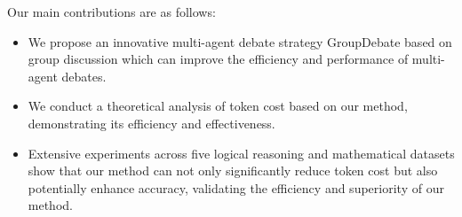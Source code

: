 Our main contributions are as follows: 

\begin{itemize}
    \item[1.] We propose an innovative multi-agent debate strategy GroupDebate based on group discussion which can improve the efficiency and performance of multi-agent debates.
    \item[2.] We conduct a theoretical analysis of token cost based on our method, demonstrating its efficiency and effectiveness.
    \item[3.] Extensive experiments across five logical reasoning and mathematical datasets show that our method can not only significantly reduce token cost but also potentially enhance accuracy, validating the efficiency and superiority of our method.
\end{itemize}